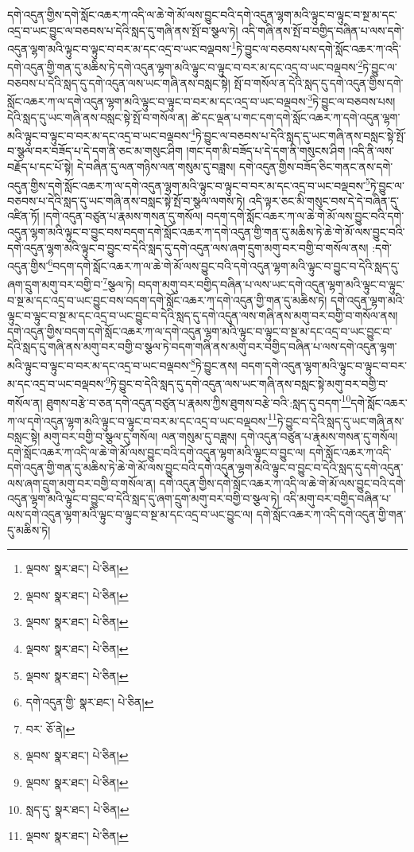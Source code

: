 དགེ་འདུན་གྱིས་དགེ་སློང་འཆར་ཀ་འདི་ལ་ཆེ་གེ་མོ་ལས་བྱུང་བའི་དགེ་འདུན་ལྷག་མའི་ལྟུང་བ་ལྟུང་བ་སྔ་མ་དང་འདྲ་བ་ཡང་བྱུང་ལ་བཅབས་པ་དེའི་སླད་དུ་གཞི་ནས་སྤོ་བ་སྩལ་ཏེ། འདི་གཞི་ནས་སྤོ་བ་བགྱིད་བཞིན་པ་ལས་དགེ་འདུན་ལྷག་མའི་ལྟུང་བ་ལྟུང་བ་བར་མ་དང་འདྲ་བ་ཡང་བལྡབས་\footnote{ལྡབས་  སྣར་ཐང་།  པེ་ཅིན། }ཏེ་བྱུང་ལ་བཅབས་པས་དགེ་སློང་འཆར་ཀ་འདི་དགེ་འདུན་གྱི་གན་དུ་མཆིས་ཏེ་དགེ་འདུན་ལྷག་མའི་ལྟུང་བ་ལྟུང་བ་བར་མ་དང་འདྲ་བ་ཡང་བལྡབས་\footnote{ལྡབས་  སྣར་ཐང་།  པེ་ཅིན། }ཏེ་བྱུང་ལ་བཅབས་པ་དེའི་སླད་དུ་དགེ་འདུན་ལས་ཡང་གཞི་ནས་བསླང་སྟེ། སྤོ་བ་གསོལ་ན་དེའི་སླད་དུ་དགེ་འདུན་གྱིས་དགེ་སློང་འཆར་ཀ་ལ་དགེ་འདུན་ལྷག་མའི་ལྟུང་བ་ལྟུང་བ་བར་མ་དང་འདྲ་བ་ཡང་བལྡབས་\footnote{ལྡབས་  སྣར་ཐང་།  པེ་ཅིན། }ཏེ་བྱུང་ལ་བཅབས་པས། དེའི་སླད་དུ་ཡང་གཞི་ནས་བསླང་སྟེ་སྤོ་བ་གསོལ་ན། ཚེ་དང་ལྡན་པ་གང་དག་དགེ་སློང་འཆར་ཀ་དགེ་འདུན་ལྷག་མའི་ལྟུང་བ་ལྟུང་བ་བར་མ་དང་འདྲ་བ་ཡང་བལྡབས་\footnote{ལྡབས་  སྣར་ཐང་།  པེ་ཅིན། }ཏེ་བྱུང་ལ་བཅབས་པ་དེའི་སླད་དུ་ཡང་གཞི་ནས་བསླང་སྟེ་སྤོ་བ་སྩལ་བར་བཟོད་པ་དེ་དག་ནི་ཅང་མ་གསུང་ཤིག །གང་དག་མི་བཟོད་པ་དེ་དག་ནི་གསུངས་ཤིག །འདི་ནི་ལས་བརྗོད་པ་དང་པོ་སྟེ། དེ་བཞིན་དུ་ལན་གཉིས་ལན་གསུམ་དུ་བཟླས། དགེ་འདུན་གྱིས་བཟོད་ཅིང་གནང་ནས་དགེ་འདུན་གྱིས་དགེ་སློང་འཆར་ཀ་ལ་དགེ་འདུན་ལྷག་མའི་ལྟུང་བ་ལྟུང་བ་བར་མ་དང་འདྲ་བ་ཡང་བལྡབས་\footnote{ལྡབས་  སྣར་ཐང་།  པེ་ཅིན། }ཏེ་བྱུང་ལ་བཅབས་པ་དེའི་སླད་དུ་ཡང་གཞི་ནས་བསླང་སྟེ་སྤོ་བ་སྩལ་ལགས་ཏེ། འདི་ལྟར་ཅང་མི་གསུང་བས་དེ་དེ་བཞིན་དུ་འཛིན་ཏོ། །དགེ་འདུན་བཙུན་པ་རྣམས་གསན་དུ་གསོལ། བདག་དགེ་སློང་འཆར་ཀ་ལ་ཆེ་གེ་མོ་ལས་བྱུང་བའི་དགེ་འདུན་ལྷག་མའི་ལྟུང་བ་བྱུང་བས་བདག་དགེ་སློང་འཆར་ཀ་དགེ་འདུན་གྱི་གན་དུ་མཆིས་ཏེ་ཆེ་གེ་མོ་ལས་བྱུང་བའི་དགེ་འདུན་ལྷག་མའི་ལྟུང་བ་བྱུང་བ་དེའི་སླད་དུ་དགེ་འདུན་ལས་ཞག་དྲུག་མགུ་བར་བགྱི་བ་གསོལ་ནས། :དགེ་འདུན་གྱིས་\footnote{དགེ་འདུན་གྱི་  སྣར་ཐང་།  པེ་ཅིན། }བདག་དགེ་སློང་འཆར་ཀ་ལ་ཆེ་གེ་མོ་ལས་བྱུང་བའི་དགེ་འདུན་ལྷག་མའི་ལྟུང་བ་བྱུང་བ་དེའི་སླད་དུ་ཞག་དྲུག་མགུ་བར་བགྱི་བ་\footnote{བར་  ཅོ་ནེ། }སྩལ་ཏེ། བདག་མགུ་བར་བགྱིད་བཞིན་པ་ལས་ཡང་དགེ་འདུན་ལྷག་མའི་ལྟུང་བ་ལྟུང་བ་སྔ་མ་དང་འདྲ་བ་ཡང་བྱུང་བས་བདག་དགེ་སློང་འཆར་ཀ་དགེ་འདུན་གྱི་གན་དུ་མཆིས་ཏེ། དགེ་འདུན་ལྷག་མའི་ལྟུང་བ་ལྟུང་བ་སྔ་མ་དང་འདྲ་བ་ཡང་བྱུང་བ་དེའི་སླད་དུ་དགེ་འདུན་ལས་གཞི་ནས་མགུ་བར་བགྱི་བ་གསོལ་ནས། དགེ་འདུན་གྱིས་བདག་དགེ་སློང་འཆར་ཀ་ལ་དགེ་འདུན་ལྷག་མའི་ལྟུང་བ་ལྟུང་བ་སྔ་མ་དང་འདྲ་བ་ཡང་བྱུང་བ་དེའི་སླད་དུ་གཞི་ནས་མགུ་བར་བགྱི་བ་སྩལ་ཏེ་བདག་གཞི་ནས་མགུ་བར་བགྱིད་བཞིན་པ་ལས་དགེ་འདུན་ལྷག་མའི་ལྟུང་བ་ལྟུང་བ་བར་མ་དང་འདྲ་བ་ཡང་བལྡབས་\footnote{ལྡབས་  སྣར་ཐང་།  པེ་ཅིན། }ཏེ་བྱུང་ནས། བདག་དགེ་འདུན་ལྷག་མའི་ལྟུང་བ་ལྟུང་བ་བར་མ་དང་འདྲ་བ་ཡང་བལྡབས་\footnote{ལྡབས་  སྣར་ཐང་།  པེ་ཅིན། }ཏེ་བྱུང་བ་དེའི་སླད་དུ་དགེ་འདུན་ལས་ཡང་གཞི་ནས་བསླང་སྟེ་མགུ་བར་བགྱི་བ་གསོལ་ན། ཐུགས་བརྩེ་བ་ཅན་དགེ་འདུན་བཙུན་པ་རྣམས་ཀྱིས་ཐུགས་བརྩེ་བའི་:སླད་དུ་བདག་\footnote{སླད་དུ་  སྣར་ཐང་།  པེ་ཅིན། }དགེ་སློང་འཆར་ཀ་ལ་དགེ་འདུན་ལྷག་མའི་ལྟུང་བ་ལྟུང་བ་བར་མ་དང་འདྲ་བ་ཡང་བལྡབས་\footnote{ལྡབས་  སྣར་ཐང་།  པེ་ཅིན། }ཏེ་བྱུང་བ་དེའི་སླད་དུ་ཡང་གཞི་ནས་བསླང་སྟེ། མགུ་བར་བགྱི་བ་སྩལ་དུ་གསོལ། ལན་གསུམ་དུ་བཟླས། དགེ་འདུན་བཙུན་པ་རྣམས་གསན་དུ་གསོལ། དགེ་སློང་འཆར་ཀ་འདི་ལ་ཆེ་གེ་མོ་ལས་བྱུང་བའི་དགེ་འདུན་ལྷག་མའི་ལྟུང་བ་བྱུང་ལ། དགེ་སློང་འཆར་ཀ་འདི་དགེ་འདུན་གྱི་གན་དུ་མཆིས་ཏེ་ཆེ་གེ་མོ་ལས་བྱུང་བའི་དགེ་འདུན་ལྷག་མའི་ལྟུང་བ་བྱུང་བ་དེའི་སླད་དུ་དགེ་འདུན་ལས་ཞག་དྲུག་མགུ་བར་བགྱི་བ་གསོལ་ན། དགེ་འདུན་གྱིས་དགེ་སློང་འཆར་ཀ་འདི་ལ་ཆེ་གེ་མོ་ལས་བྱུང་བའི་དགེ་འདུན་ལྷག་མའི་ལྟུང་བ་བྱུང་བ་དེའི་སླད་དུ་ཞག་དྲུག་མགུ་བར་བགྱི་བ་སྩལ་ཏེ། འདི་མགུ་བར་བགྱིད་བཞིན་པ་ལས་དགེ་འདུན་ལྷག་མའི་ལྟུང་བ་ལྟུང་བ་སྔ་མ་དང་འདྲ་བ་ཡང་བྱུང་ལ། དགེ་སློང་འཆར་ཀ་འདི་དགེ་འདུན་གྱི་གན་དུ་མཆིས་ཏེ། 